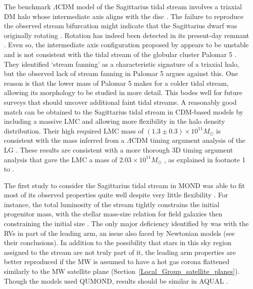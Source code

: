 \documentclass[fleqn,usenatbib,useAMS]{mnras} %
\begin{document}
The benchmark $\Lambda$CDM model of the Sagittarius tidal stream involves a triaxial DM halo whose intermediate axis aligns with the disc \citep{Law_2010}. The failure to reproduce the observed stream bifurcation might indicate that the Sagittarius dwarf was originally rotating \citep{Penarrubia_2010}. Rotation has indeed been detected in its present-day remnant \citep{Del_Pino_2021}. Even so, the intermediate axis configuration proposed by \citet{Law_2010} appears to be unstable \citep{Debbatista_2013} and is not consistent with the tidal stream of the globular cluster Palomar 5 \citep{Pearson_2015}. They identified `stream fanning' as a characteristic signature of a triaxial halo, but the observed lack of stream fanning in Palomar 5 argues against this. One reason is that the lower mass of Palomar 5 makes for a colder tidal stream, allowing its morphology to be studied in more detail. This bodes well for future surveys that should uncover additional faint tidal streams. A reasonably good match can be obtained to the Sagittarius tidal stream in CDM-based models by including a massive LMC \citep{Vasiliev_2021} and allowing more flexibility in the halo density distribution. Their high required LMC mass of $\left( 1.3 \pm 0.3 \right) \times 10^{11} M_\odot$ is consistent with the mass inferred from a $\Lambda$CDM timing argument analysis of the LG \citep{Jorge_2014, Jorge_2016, Banik_Zhao_2017}. These results are consistent with a more thorough 3D timing argument analysis that gave the LMC a mass of $2.03 \times 10^{11} M_\odot$ \citep{Banik_2018_anisotropy}, as explained in footnote 1 to \citet{Banik_2021_backsplash}.

The first study to consider the Sagittarius tidal stream in MOND was able to fit most of its observed properties quite well despite very little flexibility \citep{Thomas_2017}. For instance, the total luminosity of the stream tightly constrains the initial progenitor mass, with the stellar mass-size relation for field galaxies then constraining the initial size \citep{Dabringhausen_2013}. The only major deficiency identified by \citet{Thomas_2017} was with the RVs in part of the leading arm, an issue also faced by Newtonian models (see their conclusions). In addition to the possibility that stars in this sky region assigned to the stream are not truly part of it, the leading arm properties are better reproduced if the MW is assumed to have a hot gas corona flattened similarly to the MW satellite plane (Section~\ref{Local_Group_satellite_planes}). Though the models used QUMOND, results should be similar in AQUAL \citep{Banik_2018_EFE}.
\end{document}

